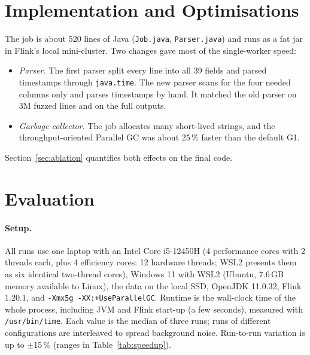 \documentclass[sigconf,nonacm]{acmart}
\begin{document}
\section{Implementation and Optimisations}
The job is about 520 lines of Java (\texttt{Job.java}, \texttt{Parser.java})
and runs as a fat jar in Flink's local mini-cluster. Two changes gave most of
the single-worker speed:
\begin{itemize}
\item \emph{Parser.} The first parser split every line into all 39 fields and
  parsed timestamps through \texttt{java.time}. The new parser scans for the
  four needed columns only and parses timestamps by hand. It matched the old
  parser on 3M fuzzed lines and on the full outputs.
\item \emph{Garbage collector.} The job allocates many short-lived strings, and
  the throughput-oriented Parallel GC was about 25\,\% faster than the default G1.
\end{itemize}
Section~\ref{sec:ablation} quantifies both effects on the final code.

\section{Evaluation}\label{sec:eval}

\paragraph{Setup.} All runs use one laptop with an Intel Core i5-12450H
(4 performance cores with 2 threads each, plus 4 efficiency cores: 12 hardware
threads; WSL2 presents them as six identical two-thread cores), Windows 11 with
WSL2 (Ubuntu, 7.6\,GB memory available to Linux), the
data on the local SSD, OpenJDK 11.0.32, Flink 1.20.1, and
\texttt{-Xmx5g -XX:+UseParallelGC}.
Runtime is the wall-clock time of the whole process, including JVM and Flink
start-up (a few seconds), measured with \texttt{/usr/bin/time}. Each value is
the median of three runs; runs of different configurations are interleaved to
spread background noise. Run-to-run variation is up to $\pm$15\,\% (ranges in
Table~\ref{tab:speedup}).
\end{document}
